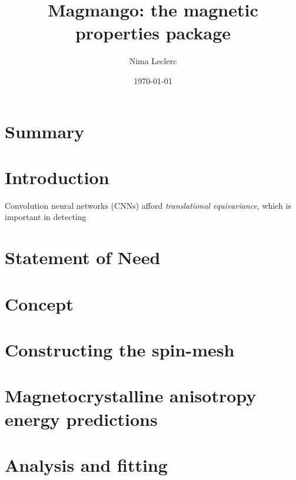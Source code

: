 \documentclass{article}
\title{Magmango: the magnetic properties package}
\author{Nima Leclerc}
\date{\today}
\begin{document}
\maketitle


\section*{Summary}
\justifying



\section*{Introduction}
\justifying
Convolution neural networks (CNNs) afford \textit{translational equivariance}, which is important in detecting 

\section*{Statement of Need}
\justifying


\section*{Concept}
\justifying



\section*{Constructing the spin-mesh}
\justifying


\section*{Magnetocrystalline anisotropy energy predictions} 
\justifying



\section*{Analysis and fitting} 
\justifying
\end{document}

